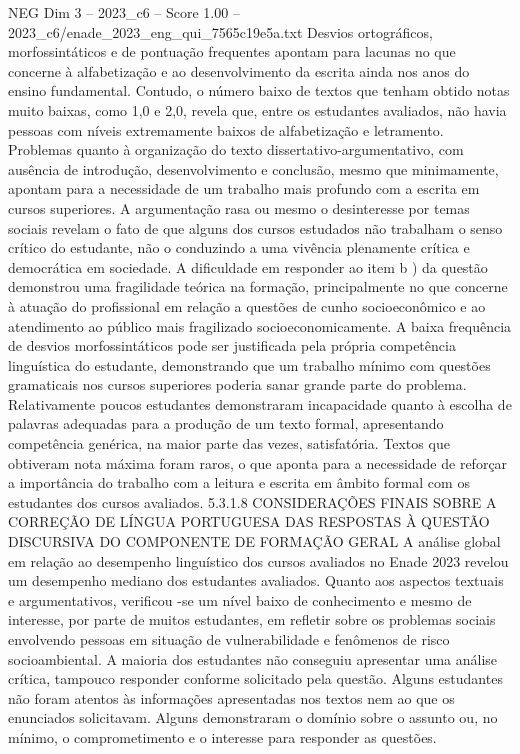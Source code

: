 \begin{textsample}{NEG Dim 3 – 2023\_c6 – Score 1.00 – 2023\_c6/enade\_2023\_eng\_qui\_7565c19e5a.txt}
Desvios ortográficos, morfossintáticos e de pontuação frequentes apontam para lacunas no que concerne à alfabetização e ao desenvolvimento da escrita ainda nos anos do ensino fundamental.
Contudo, o número baixo de textos que tenham obtido notas muito baixas, como 1,0 e 2,0, revela que, entre os estudantes avaliados, não havia pessoas com níveis extremamente baixos de alfabetização e letramento.
Problemas quanto à organização do texto dissertativo-argumentativo, com ausência de introdução, desenvolvimento e conclusão, mesmo que minimamente, apontam para a necessidade de um trabalho mais profundo com a escrita em cursos superiores.
A argumentação rasa ou mesmo o desinteresse por temas sociais revelam o fato de que alguns dos cursos estudados não trabalham o senso crítico do estudante, não o conduzindo a uma vivência plenamente crítica e democrática em sociedade.
A dificuldade em responder ao item b ) da questão demonstrou uma fragilidade teórica na formação, principalmente no que concerne à atuação do profissional em relação a questões de cunho socioeconômico e ao atendimento ao público mais fragilizado socioeconomicamente.
A baixa frequência de desvios morfossintáticos pode ser justificada pela própria competência linguística do estudante, demonstrando que um trabalho mínimo com questões gramaticais nos cursos superiores poderia sanar grande parte do problema.
Relativamente poucos estudantes demonstraram incapacidade quanto à escolha de palavras adequadas para a produção de um texto formal, apresentando competência genérica, na maior parte das vezes, satisfatória.
Textos que obtiveram nota máxima foram raros, o que aponta para a necessidade de reforçar a importância do trabalho com a leitura e escrita em âmbito formal com os estudantes dos cursos avaliados. 5.3.1.8 CONSIDERAÇÕES FINAIS SOBRE A CORREÇÃO DE LÍNGUA PORTUGUESA DAS RESPOSTAS À QUESTÃO DISCURSIVA DO COMPONENTE DE FORMAÇÃO GERAL A análise global em relação ao desempenho linguístico dos cursos avaliados no Enade 2023 revelou um desempenho mediano dos estudantes avaliados.
Quanto aos aspectos textuais e argumentativos, verificou -se um nível baixo de conhecimento e mesmo de interesse, por parte de muitos estudantes, em refletir sobre os problemas sociais envolvendo pessoas em situação de vulnerabilidade e fenômenos de risco socioambiental.
A maioria dos estudantes não conseguiu apresentar uma análise crítica, tampouco responder conforme solicitado pela questão.
Alguns estudantes não foram atentos às informações apresentadas nos textos nem ao que os enunciados solicitavam.
Alguns demonstraram o domínio sobre o assunto ou, no mínimo, o comprometimento e o interesse para responder as questões.

\end{textsample}
